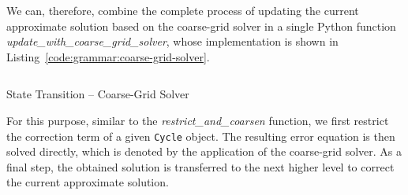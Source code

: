 We can, therefore, combine the complete process of updating the current approximate solution based on the coarse-grid solver in a single Python function \emph{update\_with\_coarse\_grid\_solver}, whose implementation is shown in Listing~\ref{code:grammar:coarse-grid-solver}.
\begin{listing}
	\inputminted{python}{evostencils/grammar/coarse_grid_solver.py}
	\caption{State Transition -- Coarse-Grid Solver}
	\label{code:grammar:coarse-grid-solver}
\end{listing}
For this purpose, similar to the \emph{restrict\_and\_coarsen} function, we first restrict the correction term of a given \texttt{Cycle} object.
The resulting error equation is then solved directly, which is denoted by the application of the coarse-grid solver.
As a final step, the obtained solution is transferred to the next higher level to correct the current approximate solution.
